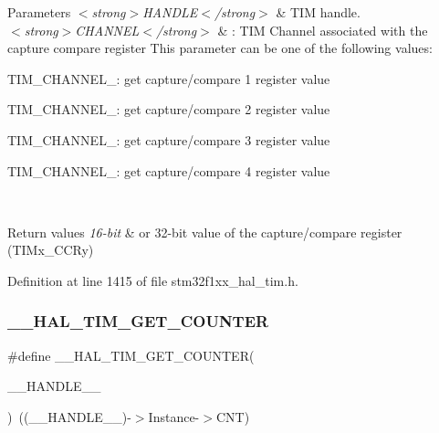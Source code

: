 \begin{DoxyParams}{Parameters}
{\em $<$strong$>$\+H\+A\+N\+D\+L\+E$<$/strong$>$} & T\+IM handle. \\
\hline
{\em $<$strong$>$\+C\+H\+A\+N\+N\+E\+L$<$/strong$>$} & \+: T\+IM Channel associated with the capture compare register This parameter can be one of the following values\+: \begin{DoxyItemize}
\item T\+I\+M\+\_\+\+C\+H\+A\+N\+N\+E\+L\+\_\+: get capture/compare 1 register value \item T\+I\+M\+\_\+\+C\+H\+A\+N\+N\+E\+L\+\_\+: get capture/compare 2 register value \item T\+I\+M\+\_\+\+C\+H\+A\+N\+N\+E\+L\+\_\+: get capture/compare 3 register value \item T\+I\+M\+\_\+\+C\+H\+A\+N\+N\+E\+L\+\_\+: get capture/compare 4 register value \end{DoxyItemize}
\\
\hline
\end{DoxyParams}

\begin{DoxyRetVals}{Return values}
{\em 16-\/bit} & or 32-\/bit value of the capture/compare register (T\+I\+Mx\+\_\+\+C\+C\+Ry) \\
\hline
\end{DoxyRetVals}


Definition at line 1415 of file stm32f1xx\+\_\+hal\+\_\+tim.\+h.

\mbox{\label{group___t_i_m___exported___macros_gaf1af08014b9d06efbbb091d58d47c8ba}} 
\subsubsection{\texorpdfstring{\+\_\+\+\_\+\+H\+A\+L\+\_\+\+T\+I\+M\+\_\+\+G\+E\+T\+\_\+\+C\+O\+U\+N\+T\+ER}{\_\_HAL\_TIM\_GET\_COUNTER}}
{\footnotesize\ttfamily \#define \+\_\+\+\_\+\+H\+A\+L\+\_\+\+T\+I\+M\+\_\+\+G\+E\+T\+\_\+\+C\+O\+U\+N\+T\+ER(\begin{DoxyParamCaption}\item[{}]{\+\_\+\+\_\+\+H\+A\+N\+D\+L\+E\+\_\+\+\_\+ }\end{DoxyParamCaption})~((\+\_\+\+\_\+\+H\+A\+N\+D\+L\+E\+\_\+\+\_\+)-\/$>$Instance-\/$>$C\+NT)}




